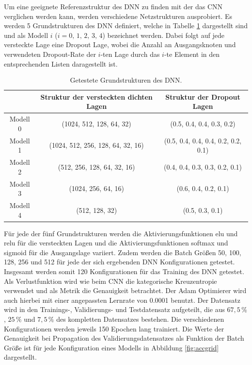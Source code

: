 Um eine geeignete Referenzstruktur des DNN zu finden mit der das CNN verglichen werden kann, werden verschiedene Netzstrukturen ausprobiert. Es werden 5 Grundstrukturen des DNN definiert, welche in Tabelle \ref{tab:DNNstruk} dargestellt sind und als Modell $i$ ($i = 0,\,1,\,2,\,3,\,4$) bezeichnet werden. Dabei folgt auf jede versteckte Lage eine Dropout Lage, wobei die Anzahl an Ausgangsknoten und verwendeten Dropout-Rate der $i$-ten Lage durch das $i$-te Element in den entsprechenden Listen daragestellt ist. \\
\captionsetup[table]{name=Tabelle}
\begin{table}[!b]
\centering
\caption{Getestete Grundstrukturen des DNN.}
\label{tab:DNNstruk}
 \begin{tabular}{c|c|c}
 & Struktur der versteckten dichten Lagen & Struktur der Dropout Lagen \\
 \hline
 Modell 0 & (1024, 512, 128, 64, 32) & (0.5, 0.4, 0.4, 0.3, 0.2) \\
 Modell 1 & (1024, 512, 256, 128, 64, 32, 16) & (0.5, 0.4, 0.4, 0.4, 0.2, 0.2, 0.1)\\
 Modell 2 & (512, 256, 128, 64, 32, 16) & (0.4, 0.4, 0.3, 0.3, 0.2, 0.1)\\
 Modell 3 & (1024, 256, 64, 16) & (0.6, 0.4, 0.2, 0.1)\\
 Modell 4 & (512, 128, 32) &  (0.5, 0.3, 0.1)\\
 \end{tabular}
\end{table}
Für jede der fünf Grundstrukturen werden die Aktivierungsfunktionen elu und relu für die versteckten Lagen und die Aktivierungsfunktionen softmax und sigmoid für die Ausgangslage variiert. Zudem werden die Batch Größen 50, 100, 128, 256 und 512 für jede der sich ergebenden DNN Konfigurationen getestet. Insgesamt werden somit 120 Konfigurationen für das Training des DNN getestet. \\
Als Verlustfunktion wird wie beim CNN die kategorische Kreuzentropie verwendet und als Metrik die Genauigkeit betrachtet. Der Adam Optimierer wird auch hierbei mit einer angepassten Lernrate von 0.0001 benutzt. Der Datensatz wird in den Trainings-, Validierungs- und Testdatensatz aufgeteilt, die aus $67,5\,\%$, $25\,\%$ und $7,5\,\%$ des kompletten Datensatzes bestehen. Die verschiedenen Konfigurationen werden jeweils 150 Epochen lang trainiert. Die Werte der Genauigkeit bei Propagation des Validierungsdatensatzes als Funktion der Batch Größe ist für jede Konfiguration eines Modells in Abbildung \ref{fig:accgrid} dargestellt.\\
